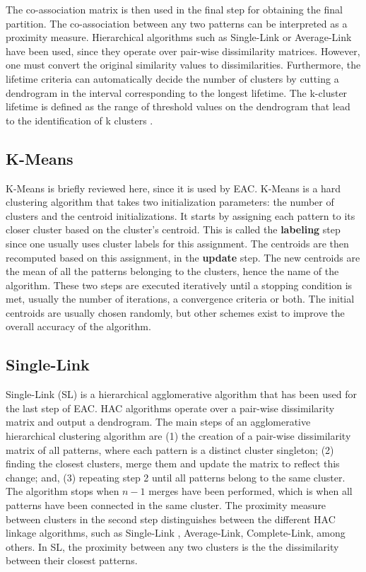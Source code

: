 The co-association matrix is then used in the final step for obtaining the final partition.
The co-association between any two patterns can be interpreted as a proximity measure.
Hierarchical algorithms such as Single-Link or Average-Link have been used, since they operate over pair-wise dissimilarity matrices.
However, one must convert the original similarity values to dissimilarities.
Furthermore, the lifetime criteria can automatically decide the number of clusters by cutting a dendrogram in the interval corresponding to the longest lifetime.
The k-cluster lifetime is defined as the range of threshold values on the dendrogram that lead to the identification of k clusters \cite{Fred2005}.

\subsection{K-Means}

K-Means is briefly reviewed here, since it is used by EAC.
K-Means is a hard clustering algorithm that takes two initialization parameters: the number of clusters and the centroid initializations.
It starts by assigning each pattern to its closer cluster based on the cluster's centroid.
This is called the \textbf{labeling} step since one usually uses cluster labels for this assignment.
The centroids are then recomputed based on this assignment, in the \textbf{update} step.
The new centroids are the mean of all the patterns belonging to the clusters, hence the name of the algorithm.
These two steps are executed iteratively until a stopping condition is met, usually the number of iterations, a convergence criteria or both.
The initial centroids are usually chosen randomly, but other schemes exist to improve the overall accuracy of the algorithm. %

\subsection{Single-Link}

Single-Link (SL) is a hierarchical agglomerative algorithm that has been used for the last step of EAC.
HAC algorithms operate over a pair-wise dissimilarity matrix and output a dendrogram.
The main steps of an agglomerative hierarchical clustering algorithm are \cite{Jain1999} (1) the creation of a pair-wise dissimilarity matrix of all patterns, where each pattern is a distinct cluster singleton; (2) finding the closest clusters, merge them and update the matrix to reflect this change; and, (3) repeating step 2 until all patterns belong to the same cluster.
The algorithm stops when $n-1$ merges have been performed, which is when all patterns have been connected in the same cluster.
The proximity measure between clusters in the second step distinguishes between the different HAC linkage algorithms, such as Single-Link , Average-Link, Complete-Link, among others.
In SL, the proximity between any two clusters is the the dissimilarity between their closest patterns.

